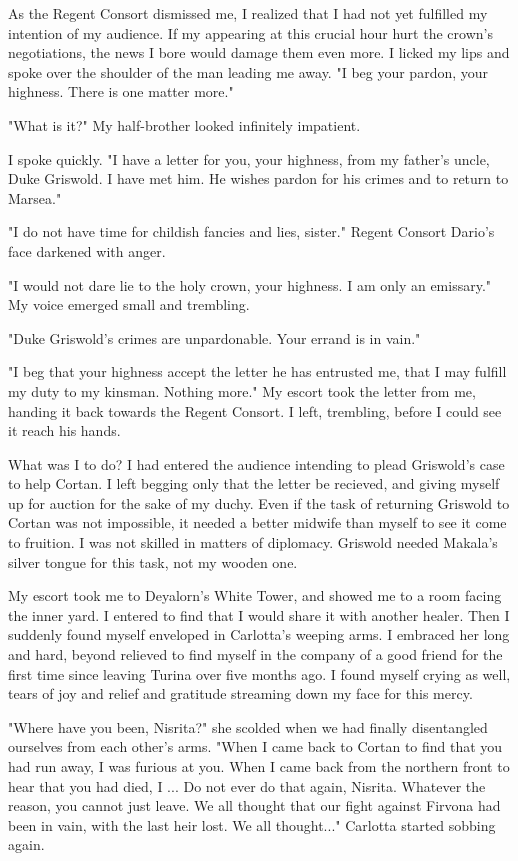 \documentclass{article}
\begin{document}
As the Regent Consort dismissed me, I realized that I had not yet fulfilled my intention of my audience. If my appearing at this crucial hour hurt the crown's negotiations, the news I bore would damage them even more. I licked my lips and spoke over the shoulder of the man leading me away. "I beg your pardon, your highness. There is one matter more."

"What is it?" My half-brother looked infinitely impatient. 

I spoke quickly. "I have a letter for you, your highness, from my father's uncle, Duke Griswold. I have met him. He wishes pardon for his crimes and to return to Marsea."

"I do not have time for childish fancies and lies, sister." Regent Consort Dario's face darkened with anger. 

"I would not dare lie to the holy crown, your highness. I am only an emissary." My voice emerged small and trembling.

"Duke Griswold's crimes are unpardonable. Your errand is in vain."

"I beg that your highness accept the letter he has entrusted me, that I may fulfill my duty to my kinsman. Nothing more." My escort took the letter from me, handing it back towards the Regent Consort. I left, trembling, before I could see it reach his hands. 

What was I to do? I had entered the audience intending to plead Griswold's case to help Cortan. I left begging only that the letter be recieved, and giving myself up for auction for the sake of my duchy. Even if the task of returning Griswold to Cortan was not impossible, it needed a better midwife than myself to see it come to fruition. I was not skilled in matters of diplomacy. Griswold needed Makala's silver tongue for this task, not my wooden one.

\vspace{.5cm}

My escort took me to Deyalorn's White Tower, and showed me to a room facing the inner yard. I entered to find that I would share it with another healer. Then I suddenly found myself enveloped in Carlotta's weeping arms. I embraced her long and hard, beyond relieved to find myself in the company of a good friend for the first time since leaving Turina over five months ago. I found myself crying as well, tears of joy and relief and gratitude streaming down my face for this mercy.

"Where have you been, Nisrita?" she scolded when we had finally disentangled ourselves from each other's arms. "When I came back to Cortan to find that you had run away, I was furious at you. When I came back from the northern front to hear that you had died, I ... Do not ever do that again, Nisrita. Whatever the reason, you cannot just leave. We all thought that our fight against Firvona had been in vain, with the last heir lost. We all thought..." Carlotta started sobbing again. 
\end{document}
